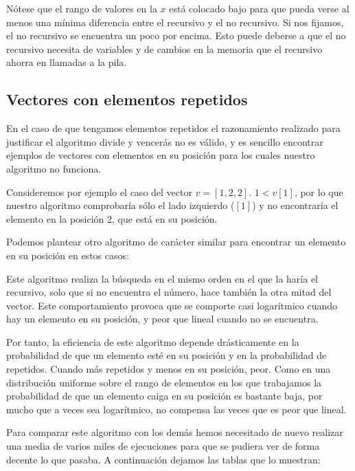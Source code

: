 Nótese que el rango de valores en la $x$ está colocado bajo para que pueda verse al menos una mínima diferencia entre el recursivo y el no recursivo. Si nos fijamos, el no recursivo se encuentra un poco por encima. Esto puede deberse a que el no recursivo necesita de variables y de cambios en la memoria que el recursivo ahorra en llamadas a la pila.

\newpage

\subsection{Vectores con elementos repetidos}

En el caso de que tengamos elementos repetidos el razonamiento realizado para justificar el algoritmo divide y vencerás no es válido, y es sencillo encontrar ejemplos de vectores con elementos en su posición para los cuales nuestro algoritmo no funciona.

Consideremos por ejemplo el caso del vector $v = [1,2,2]$. $1 <v[1]$, por lo que nuestro algoritmo comprobaría sólo el lado izquierdo ($[1]$) y no encontraría el elemento en la posición 2, que está en su posición.

Podemos plantear otro algoritmo de carácter similar para encontrar un elemento en su posición en estos casos:



Este algoritmo realiza la búsqueda en el mismo orden en el que la haría el recursivo, solo que si no encuentra el número, hace también la otra mitad del vector. Este comportamiento provoca que se comporte casi logarítmico cuando hay un elemento en su posición, y peor que lineal cuando no se encuentra.

Por tanto, la eficiencia de este algoritmo depende drásticamente en la probabilidad de que un elemento esté en su posición y en la probabilidad de repetidos. Cuando más repetidos y menos en su posición, peor. Como en una distribución uniforme sobre el rango de elementos en los que trabajamos la probabilidad de que un elemento caiga en su posición es bastante baja, por mucho que a veces sea logarítmico, no compensa las veces que es peor que lineal.

Para comparar este algoritmo con los demás hemos necesitado de nuevo realizar una media de varios miles de ejecuciones para que se pudiera ver de forma decente lo que pasaba. A continuación dejamos las tablas que lo muestran:


